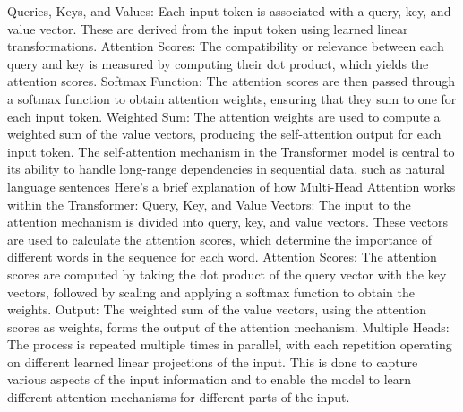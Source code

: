 \documentclass{article}%
\begin{document}
\newline%
%
Queries, Keys, and Values: Each input token is associated with a query, key, and value vector. These are derived from the input token using learned linear transformations.%
\newline%
\newline%
%
Attention Scores: The compatibility or relevance between each query and key is measured by computing their dot product, which yields the attention scores.%
\newline%
\newline%
%
Softmax Function: The attention scores are then passed through a softmax function to obtain attention weights, ensuring that they sum to one for each input token.%
\newline%
\newline%
%
Weighted Sum: The attention weights are used to compute a weighted sum of the value vectors, producing the self{-}attention output for each input token.%
\newline%
\newline%
%
The self{-}attention mechanism in the Transformer model is central to its ability to handle long{-}range dependencies in sequential data, such as natural language sentences%
\newline%
\newline%
%
Here's a brief explanation of how Multi{-}Head Attention works within the Transformer:%
\newline%
\newline%
%
Query, Key, and Value Vectors: The input to the attention mechanism is divided into query, key, and value vectors. These vectors are used to calculate the attention scores, which determine the importance of different words in the sequence for each word.%
\newline%
\newline%
%
Attention Scores: The attention scores are computed by taking the dot product of the query vector with the key vectors, followed by scaling and applying a softmax function to obtain the weights.%
\newline%
\newline%
%
Output: The weighted sum of the value vectors, using the attention scores as weights, forms the output of the attention mechanism.%
\newline%
\newline%
%
Multiple Heads: The process is repeated multiple times in parallel, with each repetition operating on different learned linear projections of the input. This is done to capture various aspects of the input information and to enable the model to learn different attention mechanisms for different parts of the input.%
\end{document}
